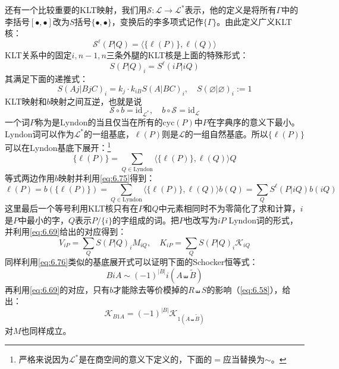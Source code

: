 还有一个比较重要的KLT映射，我们用$\mathcal{S}:\mathcal{L}\to\mathcal{L}^*$表示，他的定义是将所有$\Gamma$中的李括号$[\bullet,\bullet]$改为$S$括号$\{\bullet,\bullet\}$，变换后的李多项式记作$\{\Gamma\}$。由此定义广义KLT核：
\begin{equation}
	\mathcal{S}^\ell(P| Q)=\langle\{\ell(P)\},\ell( Q)\rangle
\end{equation}
KLT关系中的固定$i,n-1,n$三条外腿的KLT核是上面的特殊形式：
\begin{equation}
	S(P|Q)_i=S^\ell(iP|iQ)
\end{equation}
其满足下面的递推式：\cite{Carrasco:2016ldy}
\begin{equation}
	S(Aj|BjC)_i=k_j\cdot k_{iB}S(A|BC)_i,\quad S(\varnothing|\varnothing)_i:=1
\end{equation}
KLT映射和$b$映射之间互逆，也就是说
\begin{equation}
	\label{eq:6.75}
	\mathcal{S}\circ b = \mathrm{id}_{\mathcal{L}^*},\quad b\circ \mathcal{S} = \mathrm{id}_{\mathcal{L}}
\end{equation}
一个词$P$称为是Lyndon的当且仅当在所有的$\mathrm{cyc}(P)$中$P$在字典序的意义下最小。Lyndon词可以作为$\mathcal{L}^*$的一组基底，$\ell(P)$则是$\mathcal{L}$的一组自然基底。所以$\{\ell(P)\}$可以在Lyndon基底下展开：\footnote{严格来说因为$\mathcal{L}^*$是在商空间的意义下定义的，下面的$=$应当替换为$\sim$。}
\begin{equation}
	\label{eq:6.76}
	\{\ell( {P})\}=\sum_{ {Q}\in \mathrm{Lyndon}}\langle\{\ell( {P})\},\ell( {Q})\rangle {Q}
\end{equation}
等式两边作用$b$映射并利用\ref{eq:6.75}得到：
\begin{equation}
	\ell(P)=b(\{\ell(  {P})\})=\sum_{  {Q}\in\mathrm{Lyndon}}\langle\{\ell(  {P})\},\ell(  {Q})\rangle b(  {Q})=\sum_QS^\ell(P|iQ)b(iQ)
\end{equation}
这里最后一个等号利用KLT核只有在$P$和$Q$中元素相同时不为零简化了求和计算，$i$是$P$中最小的字，$Q$表示$P/\{i\}$的字组成的词。把$P$也改写为$iP$ Lyndon词的形式，并利用\ref{eq:6.69}给出的对应得到：
\begin{equation}
	\label{eq:6.78}
	V_{iP}=\sum_{Q}S(P|Q)_iM_{iQ},\quad K_{iP}=\sum_{Q}S(P|Q)_i\mathcal{K}_{iQ}
\end{equation}
同样利用\ref{eq:6.76}类似的基底展开式可以证明下面的Schocker恒等式：
\begin{equation}
	\label{eq:schocker}
	B i A \sim (-1)^{|B|} i (A \shuffle\tilde{B})
\end{equation}
再利用\ref{eq:6.69}的对应，只有$b$才能除去等价模掉的$R\shuffle S$的影响（\ref{eq:6.58}），给出：
\begin{equation}
	\label{schocker}
	\mathcal{K}_{B1A}=(-1)^{|B|}\mathcal{K}_{1(A\shuffle\tilde{B})}
\end{equation}
对$M$也同样成立。

